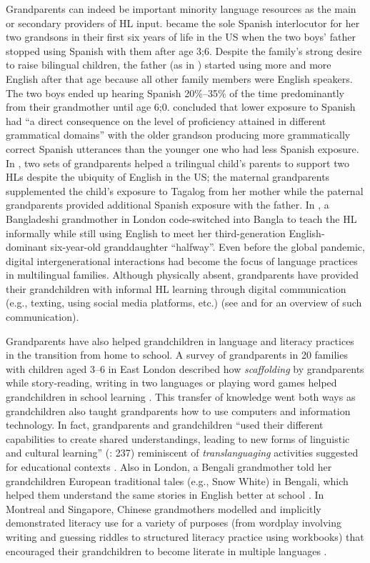 \documentclass[output=paper,colorlinks,citecolor=brown]{langscibook}
\begin{document}
Grandparents can indeed be important minority language resources as the main or secondary providers of HL input. \citet{Silva-Corvalán2014} became the sole Spanish interlocutor for her two grandsons in their first six years of life in the US when the two boys’ father stopped using Spanish with them after age 3;6. Despite the family’s strong desire to raise bilingual children, the father (as in \citealt{Smith-Christmas2014}) started using more and more English after that age because all other family members were English speakers. The two boys ended up hearing Spanish 20\%–35\% of the time predominantly from their grandmother until age 6;0. \citet[348]{Silva-Corvalán2014} concluded that lower exposure to Spanish had “a direct consequence on the level of proficiency attained in different grammatical domains” with the older grandson producing more grammatically correct Spanish utterances than the younger one who had less Spanish exposure. In \citet{Montanari2009}, two sets of grandparents helped a trilingual child’s parents to support two HLs despite the ubiquity of English in the US; the maternal grandparents supplemented the child’s exposure to Tagalog from her mother while the paternal grandparents provided additional Spanish exposure with the father. In \citet[81]{Ruby2012}, a Bangladeshi grandmother in London code-switched into Bangla to teach the HL informally while still using English to meet her third-generation English-dominant six-year-old granddaughter “halfway”. Even before the global pandemic, digital intergenerational interactions had become the focus of language practices in multilingual families. Although physically absent, grandparents have provided their grandchildren with informal HL learning through digital communication (e.g., texting, using social media platforms, etc.) (see \citealt{LanzaLexander2019} and \citealt{Palviainen2020} for an overview of such communication). 

Grandparents have also helped grandchildren in language and literacy practices in the transition from home to school. A survey of grandparents in 20 families with children aged 3–6 in East London described how \textit{scaffolding} by grandparents while story-reading, writing in two languages or playing word games helped grandchildren in school learning \citep{KennerEtAl2007}. This transfer of knowledge went both ways as grandchildren also taught grandparents how to use computers and information technology. In fact, grandparents and grandchildren “used their different capabilities to create shared understandings, leading to new forms of linguistic and cultural learning” (\citealt{KennerEtAl2007}: 237) reminiscent of \textit{translanguaging} activities suggested for educational contexts \citep{García2009}. Also in London, a Bengali grandmother told her grandchildren European traditional tales (e.g., Snow White) in Bengali, which helped them understand the same stories in English better at school \citep{GregoryEtAl2007}. In Montreal and Singapore, Chinese grandmothers modelled and implicitly demonstrated literacy use for a variety of purposes (from wordplay involving writing and guessing riddles to structured literacy practice using workbooks) that encouraged their grandchildren to become literate in multiple languages \citep{Curdt-Christiansen2013}.
\end{document}
